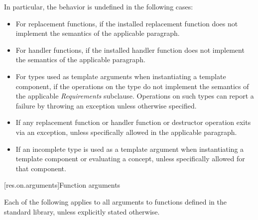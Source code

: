 \pnum
In particular, the behavior is undefined in the following cases:
\begin{itemize}
\item
For replacement functions, if the installed replacement function does not
implement the semantics of the applicable
\required
paragraph.
\item
For handler functions,
if the installed handler function does not implement the semantics of the applicable
\required
paragraph.
\item
For types used as template arguments when instantiating a template component,
if the operations on the type do not implement the semantics of the applicable
\emph{Requirements}
subclause.
Operations on such types can report a failure by throwing an exception
unless otherwise specified.
\item
If any replacement function or handler function or destructor operation exits via an exception,
unless specifically allowed
in the applicable
\required
paragraph.
\item
If an incomplete type is used as a template
argument when instantiating a template component or evaluating a concept, unless specifically
allowed for that component.
\end{itemize}

[res.on.arguments]{Function arguments}

\pnum
{}%
%
Each of the following applies to all arguments
%
to functions defined in the \Cpp{} standard library,%
unless explicitly stated otherwise.

